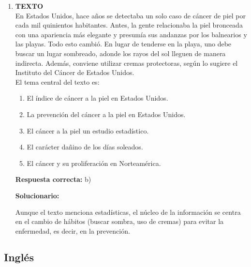 \begin{enumerate}[resume]
	\vspace{2mm}
	\textbf{Solucionario:}

	El orden lógico es: Definición (II), antecedentes históricos iniciales (I), otro caso histórico similar (IV), uso general actual (III) y perspectiva futura/específica (V).

	\vspace{6mm}

	\item \textbf{TEXTO}\\
	En Estados Unidos, hace años se detectaba un solo caso de cáncer de piel por cada mil quinientos habitantes. Antes, la gente relacionaba la piel bronceada con una apariencia más elegante y presumía sus andanzas por los balnearios y las playas. Todo esto cambió. En lugar de tenderse en la playa, uno debe buscar un lugar sombreado, adonde los rayos del sol lleguen de manera indirecta. Además, conviene utilizar cremas protectoras, según lo sugiere el Instituto del Cáncer de Estados Unidos. \\
	El tema central del texto es:
	\begin{enumerate}[label=\alph*)]
		\item El índice de cáncer a la piel en Estados Unidos.
		\item La prevención del cáncer a la piel en Estados Unidos.
		\item El cáncer a la piel un estudio estadístico.
		\item El carácter dañino de los días soleados.
		\item El cáncer y su proliferación en Norteamérica.
	\end{enumerate}
	\textbf{Respuesta correcta:} b)

	\vspace{2mm}
	\textbf{Solucionario:}

	Aunque el texto menciona estadísticas, el núcleo de la información se centra en el cambio de hábitos (buscar sombra, uso de cremas) para evitar la enfermedad, es decir, en la prevención.

	\vspace{6mm}

\end{enumerate}

\subsection*{Inglés}

